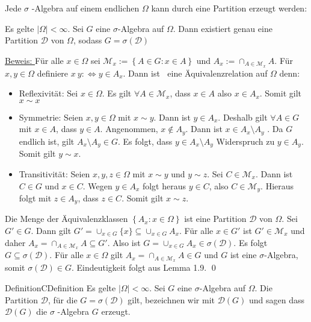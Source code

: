 \documentclass[11.5 pt, a4paper]{memoir}
\begin{document}
Jede $ \sigma $ -Algebra auf einem endlichen $ \Omega $ kann durch eine Partition erzeugt werden: 

Es gelte $ \left| \Omega  \right| < \infty $. Sei $ G $ eine $ \sigma $-Algebra auf $ \Omega  $. Dann existiert genau eine Partition 
$ \mathcal{D} $ von $ \Omega  $, sodass $ G = \sigma ( \mathcal{D}) $ 

\underline{Beweis: } Für alle $ x \in \Omega  $ sei $ \mathcal{M}_{x} := \left\{ A \in G : x \in A \right\} $ und $ A_{x} := \cap_{A \in \mathcal{M}_{x}} A $. Für $ x, y \in \Omega $ definiere $ x ~ y : \iff y \in A_{x} $. Dann ist $ ~ $ eine Äquivalenzrelation auf $\Omega$
denn: \begin{itemize}
	\item Reflexivität: Sei $ x \in \Omega  $. Es gilt $ \forall A \in \mathcal{M}_{x} $, dass $ x \in A $ also $ x \in A_{x} $. Somit 
		gilt $ x \sim x $ 
	\item Symmetrie: Seien $ x, y \in \Omega  $ mit $ x \sim y $. Dann ist $ y \in A_{x} $. Deshalb gilt $ \forall A \in G $ mit $ x \in A $, dass $ y \in A $. Angenommen, $ x \notin A_{y} $. Dann ist $ x \in A_{x} \setminus A_{y} $ . Da $ G $ endlich ist, gilt $ A_{x} \setminus A_{y} \in G $. Es folgt, dass $ y \in A_{x} \setminus A_{y} $ Widerspruch zu $ y \in A_{y} $. Somit gilt $ y \sim x $. 
	\item Transitivität: Seien $ x, y, z \in \Omega  $ mit $ x \sim y $ und $ y \sim z $. Sei $ C \in \mathcal{M}_{x} $. Dann ist $ C \in G $ und $ x \in C $. Wegen $ y \in A_{x} $ folgt heraus $ y \in C $, also $ C \in \mathcal{M}_{y} $. Hieraus folgt mit $ z \in A_{y} $, dass $ z \in C $. Somit gilt $ x \sim z $. 
\end{itemize}

Die Menge der Äquivalenzklassen $ \left\{ A_{x} : x \in \Omega  \right\} $ ist eine Partition $ \mathcal{D} $ von $ \Omega  $. Sei 
$ G' \in G $. Dann gilt $ G' = \cup_{x \in G} \{x\} \subseteq \cup_{x \in G} A_{x} $. Für alle $ x \in G' $ ist $ G' \in \mathcal{M}_{x}
$ und daher $ A_{x} = \cap_{A \in \mathcal{M}_{x}} A \subseteq G' $. Also ist $ G = \cup_{x \in G} A_{x} \in \sigma ( \mathcal{D}) $. 
Es folgt $ G \subseteq \sigma ( \mathcal{D}) $. Für alle $ x \in \Omega  $ gilt $ A_{x} = \cap_{A \in \mathcal{M}_{x}} A \in G $ und 
$ G $ ist eine $ \sigma $-Algebra, somit $ \sigma ( \mathcal{D})  \in G $. Eindeutigkeit folgt aus Lemma 1.9. \qed

\begin{ibox}[1.11]{Definition}{CDefinition}
    Es gelte $ \left| \Omega  \right| < \infty $. Sei $ G $ eine $ \sigma $-Algebra auf $ \Omega  $. Die Partition $ \mathcal{D} $,
		für die $ G = \sigma ( \mathcal{D}) $ gilt, bezeichnen wir mit $ \mathcal{D} (G) $ und sagen dass $ \mathcal{D} (G) $ die $ \sigma $ 
		-Algebra $ G $ erzeugt.
\end{ibox}
\end{document}
